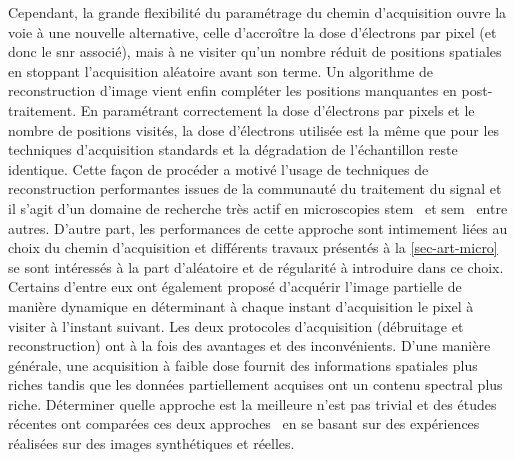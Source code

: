     Cependant, la grande flexibilité du paramétrage du chemin d'acquisition ouvre la voie à une nouvelle alternative, celle d'accroître la dose d'électrons par pixel (et donc le \gls{snr} associé), mais à ne visiter qu'un nombre réduit de positions spatiales en stoppant l'acquisition aléatoire avant son terme. Un algorithme de reconstruction d'image vient enfin compléter les positions manquantes en post-traitement. En paramétrant correctement la dose d'électrons par pixels et le nombre de positions visités, la dose d'électrons utilisée est la même que pour les techniques d'acquisition standards et la dégradation de l'échantillon reste identique. 
    Cette façon de procéder a motivé l'usage de techniques de reconstruction performantes issues de la communauté du traitement du signal et il s'agit d'un domaine de recherche très actif en microscopies \gls{stem}~\cite{beche2016compressed,stevens2014potential} et \gls{sem}~\cite{anderson2013sparse} entre autres.
    D'autre part, les performances de cette approche sont intimement liées au choix du chemin d'acquisition et différents travaux présentés à la \cref{sec-art-micro} se sont intéressés à la part d'aléatoire et de régularité à introduire dans ce choix. Certains d'entre eux ont également proposé d'acquérir l'image partielle de manière dynamique en déterminant à chaque instant d'acquisition le pixel à visiter à l'instant suivant.
    Les deux protocoles d'acquisition (débruitage et reconstruction) ont à la fois des avantages et des inconvénients. D'une manière générale, une acquisition à faible dose fournit des informations spatiales plus riches tandis que les données partiellement acquises ont un contenu spectral plus riche. Déterminer quelle approche est la meilleure n'est pas trivial et des études récentes ont comparées ces deux approches~\cite{trampert2018ultramicroscopy,sanders2020inpainting,sanders2018inpainting} en se basant sur des expériences réalisées sur des images synthétiques et réelles.
    
